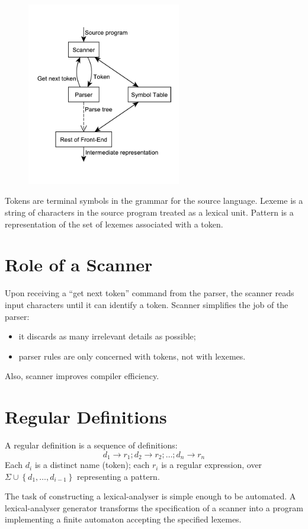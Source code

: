 \begin{figure}[H]
    \centerline{\includegraphics[width=0.6\textwidth]{img/13.pdf}}
\end{figure}

Tokens are terminal symbols in the grammar for the source language.
Lexeme is a string of characters in the source program treated as a lexical unit.
Pattern is a representation of the set of lexemes associated with a token.

\section{Role of a Scanner}
Upon receiving a ``get next token'' command from the parser, the scanner reads input characters until it can identify a token.
Scanner simplifies the job of the parser:
\begin{itemize}
    \item it discards as many irrelevant details as possible;
    \item parser rules are only concerned with tokens, not with lexemes.
\end{itemize}
Also, scanner improves compiler efficiency.

\section{Regular Definitions}
A regular definition is a sequence of definitions:
$$
    d_1 \to r_1; d_2 \to r_2; \ldots; d_n \to r_n
$$
Each $d_i$ is a distinct name (token); each $r_i$ is a regular expression, over $\Sigma \cup \left\{d_1, \ldots, d_{i-1}\right\}$ representing a pattern.

The task of constructing a lexical-analyser is simple enough to be automated.
A lexical-analyser generator transforms the specification of a scanner into a program implementing a finite automaton accepting the specified lexemes.